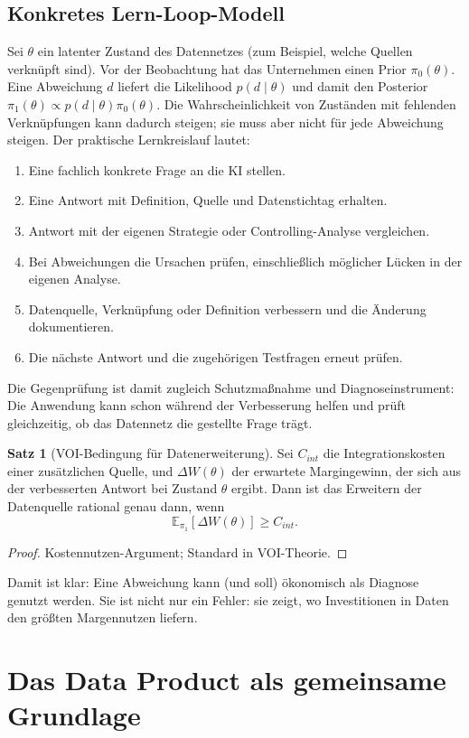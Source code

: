 \documentclass[a4paper,12pt]{article}
\theoremstyle{definition}
\newtheorem{satz}[definition]{Satz}
\newcommand{\E}{\mathbb{E}}
\begin{document}
\subsection{Konkretes Lern-Loop-Modell}
Sei $\theta$ ein latenter Zustand des Datennetzes (zum Beispiel, welche Quellen verknüpft sind). Vor der Beobachtung hat das Unternehmen einen Prior $\pi_0(\theta)$. Eine Abweichung $d$ liefert die Likelihood $p(d\mid\theta)$ und damit den Posterior $\pi_1(\theta)\propto p(d\mid\theta)\pi_0(\theta)$. Die Wahrscheinlichkeit von Zuständen mit fehlenden Verknüpfungen kann dadurch steigen; sie muss aber nicht für jede Abweichung steigen. Der praktische Lernkreislauf lautet:
\begin{enumerate}
\item Eine fachlich konkrete Frage an die KI stellen.
\item Eine Antwort mit Definition, Quelle und Datenstichtag erhalten.
\item Antwort mit der eigenen Strategie oder Controlling-Analyse vergleichen.
\item Bei Abweichungen die Ursachen prüfen, einschließlich möglicher Lücken in der eigenen Analyse.
\item Datenquelle, Verknüpfung oder Definition verbessern und die Änderung dokumentieren.
\item Die nächste Antwort und die zugehörigen Testfragen erneut prüfen.
\end{enumerate}
Die Gegenprüfung ist damit zugleich Schutzmaßnahme und Diagnoseinstrument: Die Anwendung kann schon während der Verbesserung helfen und prüft gleichzeitig, ob das Datennetz die gestellte Frage trägt.

\begin{satz}[VOI-Bedingung für Datenerweiterung]
Sei $C_{int}$ die Integrationskosten einer zusätzlichen Quelle, und $\Delta W(\theta)$ der erwartete Margingewinn, der sich aus der verbesserten Antwort bei Zustand $\theta$ ergibt. Dann ist das Erweitern der Datenquelle rational genau dann, wenn
\[
\E_{\pi_1}[\Delta W(\theta)] \ge C_{int}.
\]
\end{satz}
\begin{proof}
Kostennutzen-Argument; Standard in VOI-Theorie.
\end{proof}

Damit ist klar: Eine Abweichung kann (und soll) ökonomisch als Diagnose genutzt werden. Sie ist nicht nur ein Fehler: sie zeigt, wo Investitionen in Daten den größten Margennutzen liefern.

\section{Das Data Product als gemeinsame Grundlage}
\label{sec:data-product}
\end{document}
